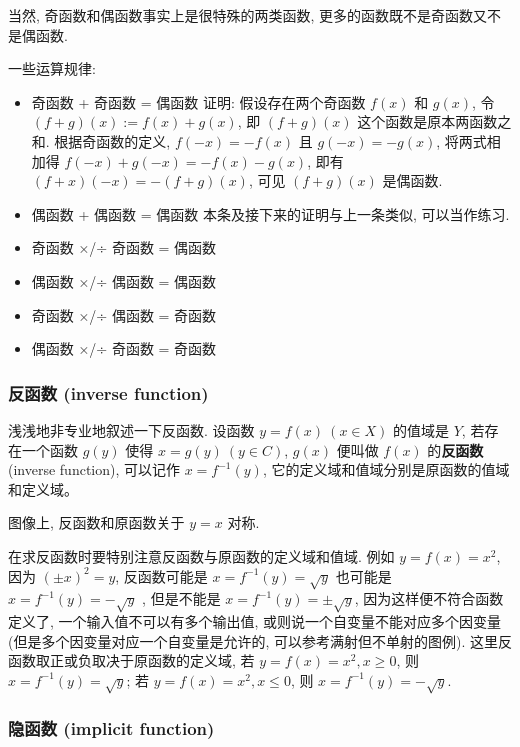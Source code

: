 当然, 奇函数和偶函数事实上是很特殊的两类函数,
更多的函数既不是奇函数又不是偶函数.

一些运算规律:

\begin{itemize}
\tightlist
\item
  奇函数 + 奇函数 = 偶函数 证明: 假设存在两个奇函数 \(f(x)\) 和
  \(g(x)\), 令 \((f+g)(x) := f(x) + g(x)\), 即 \((f+g)(x)\)
  这个函数是原本两函数之和. 根据奇函数的定义, \(f(-x)=-f(x)\) 且
  \(g(-x)=-g(x)\), 将两式相加得 \(f(-x)+g(-x)=-f(x)-g(x)\), 即有
  \((f+x)(-x)=-(f+g)(x)\), 可见 \((f+g)(x)\) 是偶函数.
\item
  偶函数 + 偶函数 = 偶函数 本条及接下来的证明与上一条类似, 可以当作练习.
\item
  奇函数 ×/÷ 奇函数 = 偶函数
\item
  偶函数 ×/÷ 偶函数 = 偶函数
\item
  奇函数 ×/÷ 偶函数 = 奇函数
\item
  偶函数 ×/÷ 奇函数 = 奇函数
\end{itemize}

\hypertarget{ux53cdux51fdux6570-inverse-function}{%
\subsubsection{反函数 (inverse
function)}\label{ux53cdux51fdux6570-inverse-function}}

浅浅地非专业地叙述一下反函数. 设函数 \(y=f(x)\ (x\in X)\) 的值域是
\(Y\), 若存在一个函数 \(g(y)\) 使得 \(x= g(y)\ (y\in C)\), \(g(x)\)
便叫做 \(f(x)\) 的\textbf{反函数} (inverse function), 可以记作
\(x=f^{-1}(y)\), 它的定义域和值域分别是原函数的值域和定义域。

图像上, 反函数和原函数关于 \(y=x\) 对称.

在求反函数时要特别注意反函数与原函数的定义域和值域. 例如 \(y=f(x)=x^2\),
因为 \((\pm x)^2=y\), 反函数可能是 \(x=f^{-1}(y)=\sqrt{y}\) 也可能是
\(x=f^{-1}(y)=-\sqrt{y}\) , 但是不能是 \(x=f^{-1}(y)=\pm\sqrt{y}\),
因为这样便不符合函数定义了, 一个输入值不可以有多个输出值,
或则说一个自变量不能对应多个因变量
(但是多个因变量对应一个自变量是允许的, 可以参考满射但不单射的图例).
这里反函数取正或负取决于原函数的定义域, 若 \(y=f(x)=x^2, x\ge 0\), 则
\(x=f^{-1}(y)=\sqrt{y}\); 若 \(y=f(x)=x^2, x\le 0\), 则
\(x=f^{-1}(y)=-\sqrt{y}\).

\hypertarget{ux9690ux51fdux6570-implicit-function}{%
\subsubsection{隐函数 (implicit
function)}\label{ux9690ux51fdux6570-implicit-function}}

